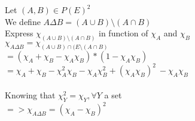 \documentclass{article}
\begin{document}
\noindent Let $(A, B) \in P(E)^2$\\
We define $A \Delta B = (A \cup B) \setminus (A \cap B)$\\
Express $ \chi_{(A \cup B) \setminus (A \cap B)} $ in function of $ \chi_A$ and $\chi_B$\\

\noindent
$ \chi_{A \Delta B}  = \chi_{(A\cup B)\cap (E \setminus (A\cap B)}$\\
$ =  (\chi_{A} + \chi_{B} - \chi_{A}\chi_{B}) * (1 - \chi_{A}\chi_{B})$\\
$ = \chi_{A} + \chi_{B} - \chi_{A}^2\chi_{B} - \chi_{A}\chi_{B}^2 + (\chi_{A}\chi_{B})^2 \ - \chi_{A}\chi_{B}$\\\\
Knowing that $\chi_{Y}^2 = \chi_{Y}, \forall Y $ a set\\
$=> \chi_{A\Delta B} = (\chi_{A} - \chi_{B})^2$
\end{document}
